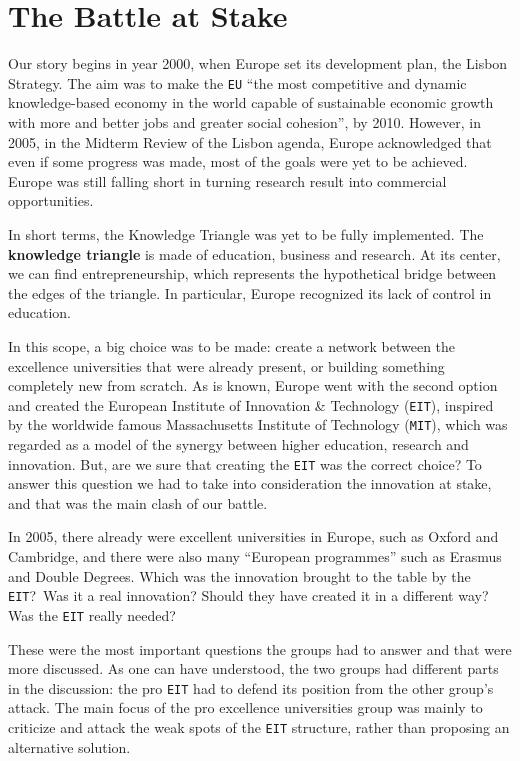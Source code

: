 \documentclass[11pt,a4paper,oneside,twocolumn]{IEEEtran}
\begin{document}
\section{The Battle at Stake}
Our story begins in year 2000, when Europe set its development plan, the Lisbon Strategy. The aim was to make the \texttt{EU} ``the most competitive and dynamic knowledge-based economy in the world capable of sustainable economic growth with more and better jobs and greater social cohesion''\cite{2_1}, by 2010. However, in 2005, in the Midterm Review of the Lisbon agenda, Europe acknowledged that even if some progress was made, most of the goals were yet to be achieved. Europe was still falling short in turning research result into commercial opportunities.

In short terms, the Knowledge Triangle was yet to be fully implemented. The \textbf{knowledge triangle} is made of education, business and research. At its center, we can find entrepreneurship, which represents the hypothetical bridge between the edges of the triangle. In particular, Europe recognized its lack of control in education.

In this scope, a big choice was to be made: create a network between the excellence universities that were already present, or building something completely new from scratch. As is known, Europe went with the second option and created the European Institute of Innovation \& Technology (\texttt{EIT}), inspired by the worldwide famous Massachusetts Institute of Technology (\texttt{MIT}), which was regarded as a model of the synergy between higher education, research and innovation. But, are we sure that creating the \texttt{EIT} was the correct choice? To answer this question we had to take into consideration the innovation at stake, and that was the main clash of our battle.

In 2005, there already were excellent universities in Europe, such as Oxford and Cambridge, and there were also many ``European programmes'' such as Erasmus and Double Degrees.
Which was the innovation brought to the table by the \texttt{EIT}?\ Was it a real innovation? Should they have created it in a different way? Was the \texttt{EIT} really needed?

These were the most important questions the groups had to answer and that were more discussed. As one can have understood, the two groups had different parts in the discussion: the pro \texttt{EIT} had to defend its position from the other group's attack. The main focus of the pro excellence universities group was mainly to criticize and attack the weak spots of the \texttt{EIT} structure, rather than proposing an alternative solution.
\end{document}
